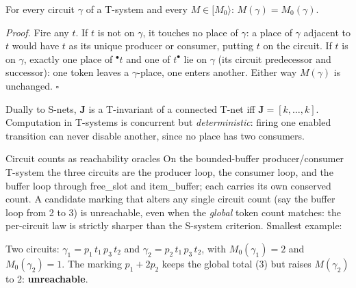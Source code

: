 \begin{proposition}
For every circuit $\gamma$ of a T-system and every $M \in [M_0\rangle$: $M(\gamma) = M_0(\gamma)$.
\end{proposition}
\textit{Proof.} Fire any $t$. If $t$ is not on $\gamma$, it touches no place of $\gamma$: a place of $\gamma$ adjacent to $t$ would have $t$ as its unique producer or consumer, putting $t$ on the circuit. If $t$ is on $\gamma$, exactly one place of ${}^\bullet t$ and one of $t^\bullet$ lie on $\gamma$ (its circuit predecessor and successor): one token leaves a $\gamma$-place, one enters another. Either way $M(\gamma)$ is unchanged. \hfill$\square$

Dually to S-nets, $\mathbf{J}$ is a T-invariant of a connected T-net iff $\mathbf{J} = [k, \ldots, k]$. Computation in T-systems is concurrent but \emph{deterministic}: firing one enabled transition can never disable another, since no place has two consumers.

\begin{examplebox}{Circuit counts as reachability oracles}
On the bounded-buffer producer/consumer T-system the three circuits are the producer loop, the consumer loop, and the buffer loop through \textsf{free\_slot} and \textsf{item\_buffer}; each carries its own conserved count. A candidate marking that alters any single circuit count (say the buffer loop from 2 to 3) is unreachable, even when the \emph{global} token count matches: the per-circuit law is strictly sharper than the S-system criterion. Smallest example:
\begin{center}
\end{center}
Two circuits: $\gamma_1 = p_1\, t_1\, p_3\, t_2$ and $\gamma_2 = p_2\, t_1\, p_3\, t_2$, with $M_0(\gamma_1) = 2$ and $M_0(\gamma_2) = 1$. The marking $p_1 + 2p_2$ keeps the global total (3) but raises $M(\gamma_2)$ to 2: \textbf{unreachable}.
\end{examplebox}

